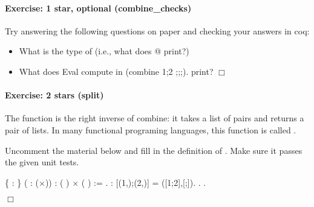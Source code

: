 \documentclass[12pt]{report}
\begin{document}
\paragraph{Exercise: 1 star, optional (combine\_checks)}

 Try answering the following questions on paper and
    checking your answers in coq:



\begin{itemize}
\item  What is the type of  (i.e., what does 
      @ print?)

\item  What does
        Eval compute in (combine 1;2 ;;;).
      print?   \ensuremath{\Box}

\end{itemize}


\paragraph{Exercise: 2 stars (split)}

 The function  is the right inverse of combine: it takes a
    list of pairs and returns a pair of lists.  In many functional
    programing languages, this function is called .


    Uncomment the material below and fill in the definition of
    .  Make sure it passes the given unit tests. \begin{coqdoccode}
\coqdocemptyline
\coqdocnoindent
{} \coqdoceol
\coqdocindent{5.50em}
\{  : \} ( :  (\ensuremath{\times}))\coqdoceol
\coqdocindent{5.50em}
: ( ) \ensuremath{\times} ( ) :=\coqdoceol
\coqdocnoindent
 .\coqdoceol
\coqdocemptyline
\coqdocnoindent
{} :\coqdoceol
\coqdocindent{1.00em}
 [(1,);(2,)] = ([1;2],[;]).\coqdoceol
\coqdocnoindent
{}.\coqdoceol
 .\coqdoceol
\end{coqdoccode}
\ensuremath{\Box} \begin{coqdoccode}
\coqdocemptyline
\end{coqdoccode}
\end{document}
